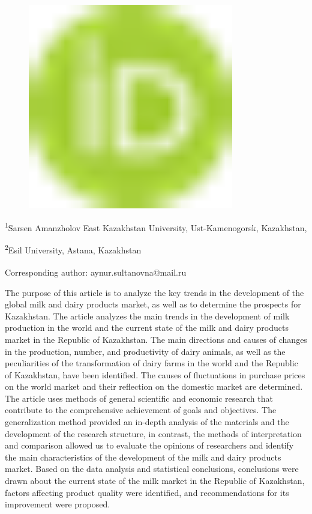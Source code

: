 \begin{figure}[H]
	\centering
	\includegraphics[width=0.8\textwidth]{media/ekon/image1}
	\caption*{}
\end{figure}


\textsuperscript{1}Sarsen Amanzholov East Kazakhstan University,
Ust-Kamenogorsk, Kazakhstan,

\textsuperscript{2}Esil University, Astana, Kazakhstan

{\bfseries \textsuperscript{\envelope }}Corresponding author:
aynur.sultanovna@mail.ru

The purpose of this article is to analyze the key trends in the
development of the global milk and dairy products market, as well as to
determine the prospects for Kazakhstan. The article analyzes the main
trends in the development of milk production in the world and the
current state of the milk and dairy products market in the Republic of
Kazakhstan. The main directions and causes of changes in the production,
number, and productivity of dairy animals, as well as the peculiarities
of the transformation of dairy farms in the world and the Republic of
Kazakhstan, have been identified. The causes of fluctuations in purchase
prices on the world market and their reflection on the domestic market
are determined. The article uses methods of general scientific and
economic research that contribute to the comprehensive achievement of
goals and objectives. The generalization method provided an in-depth
analysis of the materials and the development of the research structure,
in contrast, the methods of interpretation and comparison allowed us to
evaluate the opinions of researchers and identify the main
characteristics of the development of the milk and dairy products
market. Based on the data analysis and statistical conclusions,
conclusions were drawn about the current state of the milk market in the
Republic of Kazakhstan, factors affecting product quality were
identified, and recommendations for its improvement were proposed.

